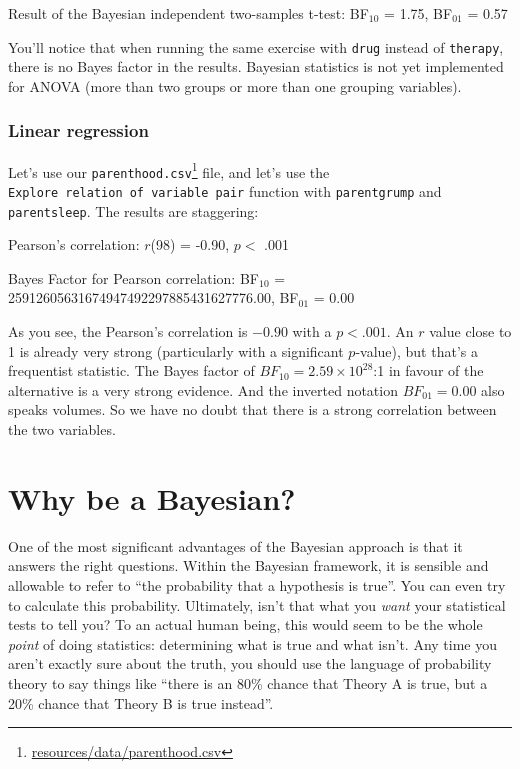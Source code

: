 \documentclass[
  11pt,
  a4paper,
  twoside,symmetric,openright]{book}
\theoremstyle{break}
\theoremstyle{break}
\DeclareRobustCommand{\href}[2]{#2\footnote{\url{#1}}}
\begin{document}
\begin{tcolorbox}[colback=white,
  colframe=lightgray,
  coltext=black,
  boxsep=4pt,
  boxrule=0.3pt,
  arc=0pt]
  {   \sffamily
      \color{black}
      Result of the Bayesian independent two-samples t-test: BF$_{10}$ = 1.75, BF$_{01}$ = 0.57

      \normalfont
  }
\end{tcolorbox}

You'll notice that when running the same exercise with \texttt{drug} instead of \texttt{therapy}, there is no Bayes factor in the results. Bayesian statistics is not yet implemented for ANOVA (more than two groups or more than one grouping variables).

\subsection{Linear regression}\label{linear-regression}

Let's use our \href{resources/data/parenthood.csv}{\texttt{parenthood.csv}} file, and let's use the \texttt{Explore\ relation\ of\ variable\ pair} function with \texttt{parentgrump} and \texttt{parentsleep}. The results are staggering:

\begin{tcolorbox}[colback=white,
  colframe=lightgray,
  coltext=black,
  boxsep=4pt,
  boxrule=0.3pt,
  arc=0pt]
  {   \sffamily
      \color{black}
      Pearson's correlation: $r$(98) = -0.90, $p <$ .001

      Bayes Factor for Pearson correlation: BF$_{10}$ = 25912605631674947492297885431627776.00, BF$_{01}$ = 0.00

      \normalfont
  }
\end{tcolorbox}

As you see, the Pearson's correlation is \(-0.90\) with a \(p < .001\). An \(r\) value close to 1 is already very strong (particularly with a significant \(p\)-value), but that's a frequentist statistic. The Bayes factor of \(BF_{10} = 2.59 \times 10^{28}\):1 in favour of the alternative is a very strong evidence. And the inverted notation \(BF_{01} = 0.00\) also speaks volumes. So we have no doubt that there is a strong correlation between the two variables.

\chapter{Why be a Bayesian?}\label{whybayes}

One of the most significant advantages of the Bayesian approach is that it answers the right questions. Within the Bayesian framework, it is sensible and allowable to refer to ``the probability that a hypothesis is true''. You can even try to calculate this probability. Ultimately, isn't that what you \emph{want} your statistical tests to tell you? To an actual human being, this would seem to be the whole \emph{point} of doing statistics: determining what is true and what isn't. Any time you aren't exactly sure about the truth, you should use the language of probability theory to say things like ``there is an 80\% chance that Theory A is true, but a 20\% chance that Theory B is true instead''.
\end{document}

